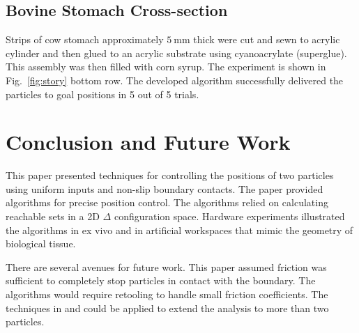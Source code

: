 \subsection{Bovine Stomach Cross-section}


Strips of cow stomach approximately $\SI{5}{\milli\metre}$ thick were cut and sewn to acrylic cylinder and then glued to an acrylic substrate using cyanoacrylate (superglue). This assembly was then filled with corn syrup. The experiment is shown in Fig.~\ref{fig:story} bottom row. The developed algorithm successfully delivered the particles to goal positions in 5 out of 5 trials.


\section{Conclusion and Future Work}\label{sec:conclusion}

This paper presented techniques for controlling the positions of two particles using uniform inputs and non-slip boundary contacts.  
The paper provided algorithms for precise position control. The algorithms relied on calculating reachable sets in a 2D $\Delta$ configuration space.
Hardware experiments illustrated the algorithms in ex vivo and in artificial workspaces that mimic the geometry of biological tissue.

There are several avenues for future work. This paper assumed friction was sufficient to completely stop particles in contact with the boundary. 
  The algorithms would require retooling to handle small friction coefficients. The techniques in \cite{shahrokhi2017algorithms} and  \cite{AaronManipulation2013} could be applied to extend the analysis to more than two particles.
  

